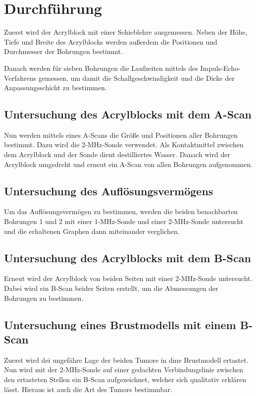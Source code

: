 \section{Durchführung}
\label{sec:Durchfuehrung}

Zuerst wird der Acrylblock mit einer Schieblehre ausgemessen. Neben der Höhe, Tiefe und 
Breite des Acrylblocks werden außerdem die Positionen und Durchmesser der Bohrungen bestimmt.

Danach werden für sieben Bohrungen die Laufzeiten mittels des Impuls-Echo-Verfahrens gemessen, um 
damit die Schallgeschwindigkeit und die Dicke der Anpassungsschicht zu bestimmen.

\subsection{Untersuchung des Acrylblocks mit dem A-Scan}
Nun werden mittels eines A-Scans die Größe und Positionen aller Bohrungen bestimmt. Dazu wird die 
2-MHz-Sonde verwendet. Als Kontaktmittel zwischen dem Acrylblock und der Sonde dient destilliertes Wasser.
Danach wird der Acrylblock umgedreht und erneut ein A-Scan von allen Bohrungen aufgenommen.

\subsection{Untersuchung des Auflösungsvermögens}
Um das Auflösungsvermögen zu bestimmen, werden die beiden benachbarten Bohrungen 1 und 2 mit einer 1-MHz-Sonde 
und einer 2-MHz-Sonde untersucht und die erhaltenen Graphen dann miteinander verglichen.

\subsection{Untersuchung des Acrylblocks mit dem B-Scan}
Erneut wird der Acrylblock von beiden Seiten mit einer 2-MHz-Sonde untersucht. Dabei wird ein B-Scan beider 
Seiten erstellt, um die Abmessungen der Bohrungen zu bestimmen.

\subsection{Untersuchung eines Brustmodells mit einem B-Scan}
Zuerst wird dei ungefähre Lage der beiden Tumore in dme Brustmodell ertastet. Nun wird mit der 2-MHz-Sonde 
auf einer gedachten Verbindungslinie zwischen den ertasteten Stellen ein B-Scan aufgezeichnet, welcher 
sich qualitativ erklären lässt. Hieraus ist auch die Art des Tumors bestimmbar.